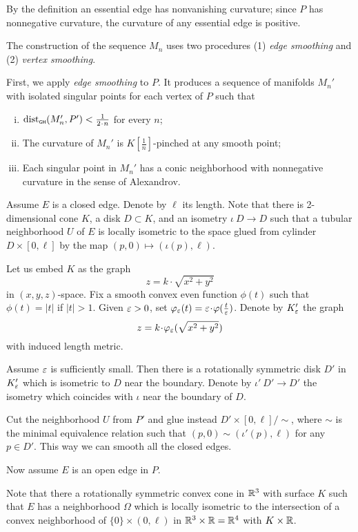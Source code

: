 \documentclass[a4paper,10pt]{amsart}
\begin{document}
By the definition an essential edge has nonvanishing curvature;
since $P$ has nonnegative curvature,
the curvature of any essential edge is positive.

The construction of the sequence $M_n$ uses two procedures  
(1) \emph{edge smoothing} and 
(2) \emph{vertex smoothing}.

First, we apply \emph{edge smoothing} to $P$.
It produces %
a sequence of manifolds $M_n'$
with isolated singular points for each vertex of $P$
such that 
\begin{enumerate}[(i)]
\item $\dist_\GH(M_n',P')<\tfrac1{2\cdot n}$ for every $n$;
\item The curvature of $M_n'$ is $K[\tfrac1n]$-pinched at any smooth point;
\item Each singular point in $M_n'$ has a conic neighborhood with nonnegative curvature in the sense of Alexandrov.
\end{enumerate}

Assume $E$ is a closed edge.
Denote by $\ell$ its length.
Note that there is 2-dimensional cone $K$, 
a disk $D\subset K$,
and an isometry $\iota\:D\to D$
such that a tubular neighborhood $U$ of $E$ is locally isometric to the space glued from cylinder $D\times [0,\ell]$
by the map $(p,0)\mapsto(\iota(p),\ell)$.

Let us embed $K$ as the graph \[z=k\cdot\sqrt{x^2+y^2}\]
in $(x,y,z)$-space.
Fix a smooth convex even function $\phi(t)$ such that $\phi(t)=|t|$ if $|t|>1$.
Given $\varepsilon>0$, set $\phi_\eps(t)=\eps\cdot\phi(\tfrac t\eps)$.
Denote by $K'_\varepsilon$ the graph
\[z=k\cdot\phi_\eps(\sqrt{x^2+y^2})\]
with induced length metric.

Assume $\varepsilon$ is sufficiently small.
Then there is a rotationally symmetric disk $D'$ in $K'_\varepsilon$
which is isometric to $D$ near the boundary.
Denote by $\iota'\:D'\to D'$ the isometry which coincides with $\iota$ near the boundary of $D$.


Cut the neighborhood $U$ from $P'$ and glue instead $D'\times [0,\ell]/\sim$,
where $\sim$ is the minimal equivalence relation
such that $(p,0)\sim (\iota'(p),\ell)$ 
for any $p\in D'$.
This way we can smooth all the closed edges.

\smallskip

Now assume $E$ is an open edge in $P$.

Note that there a rotationally symmetric convex cone in $\mathbb{R}^3$ 
with surface $K$
such that 
$E$ has a neighborhood $\Omega$ 
which is locally isometric to the intersection of a convex neighborhood  of $\{0\}\times(0,\ell)$ in $\mathbb{R}^3\times\mathbb{R}=\mathbb{R}^4$ with $K\times \mathbb{R}$.
\end{document}
